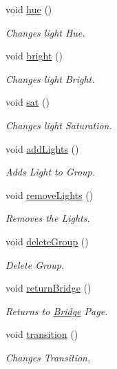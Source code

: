 \begin{DoxyCompactItemize}
void \hyperlink{classGroupsSchedulerControlWidget_a11955a39bb867453921c29c181389f20}{hue} ()
\begin{DoxyCompactList}\small\item\em Changes light Hue. \end{DoxyCompactList}\item 
void \hyperlink{classGroupsSchedulerControlWidget_a295debac5e291f952108ef4be62d83bf}{bright} ()
\begin{DoxyCompactList}\small\item\em Changes light Bright. \end{DoxyCompactList}\item 
void \hyperlink{classGroupsSchedulerControlWidget_a86aee0c2e5ae90cbfc6a030378192798}{sat} ()
\begin{DoxyCompactList}\small\item\em Changes light Saturation. \end{DoxyCompactList}\item 
void \hyperlink{classGroupsSchedulerControlWidget_afdda9b692acc5593ce6abe1c289af4a1}{add\+Lights} ()
\begin{DoxyCompactList}\small\item\em Adds Light to Group. \end{DoxyCompactList}\item 
void \hyperlink{classGroupsSchedulerControlWidget_a6a41067210bf25219d9ce549d66e9cb3}{remove\+Lights} ()
\begin{DoxyCompactList}\small\item\em Removes the Lights. \end{DoxyCompactList}\item 
void \hyperlink{classGroupsSchedulerControlWidget_ac6df8b1ffb9a360bd150719aba1b0e75}{delete\+Group} ()
\begin{DoxyCompactList}\small\item\em Delete Group. \end{DoxyCompactList}\item 
void \hyperlink{classGroupsSchedulerControlWidget_ab3b930d886e904073f2c92c6709708d6}{return\+Bridge} ()
\begin{DoxyCompactList}\small\item\em Returns to \hyperlink{classBridge}{Bridge} Page. \end{DoxyCompactList}\item 
void \hyperlink{classGroupsSchedulerControlWidget_aa7d3d6be889386d9a524bd4a3eb06c53}{transition} ()
\begin{DoxyCompactList}\small\item\em Changes Transition. \end{DoxyCompactList}\item 

\end{DoxyCompactItemize}
